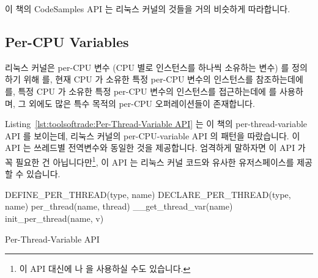 {{{{이 책의 CodeSamples API 는 리눅스 커널의 것들을 거의 비슷하게 따라합니다.

\subsection{Per-CPU Variables}
\label{sec:toolsoftrade:Per-CPU Variables}

리눅스 커널은 per-CPU 변수 (CPU 별로 인스턴스를 하나씩 소유하는 변수) 를
정의하기 위해  를, 현재 CPU 가 소유한 특정 per-CPU 변수의
인스턴스를 참조하는데에  를, 특정 CPU 가 소유한 특정 per-CPU
변수의 인스턴스를 접근하는데에  를 사용하며, 그 외에도 많은 특수
목적의 per-CPU 오퍼레이션들이 존재합니다.

Listing~\ref{lst:toolsoftrade:Per-Thread-Variable API}
는 이 책의 per-thread-variable API 를 보이는데, 리눅스 커널의 per-CPU-variable
API 의 패턴을 따랐습니다.
이 API 는 쓰레드별 전역변수와 동일한 것을 제공합니다.
엄격하게 말하자면 이 API 가 꼭 필요한 건 아닙니다만\footnote{
	이 API 대신에  나  을 사용하실 수도
	있습니다.},
이 API 는 리눅스 커널 코드와 유사한 유저스페이스를 제공할 수 있습니다.

\begin{listing}[tbp]
\begin{VerbatimL}[numbers=none]
DEFINE_PER_THREAD(type, name)
DECLARE_PER_THREAD(type, name)
per_thread(name, thread)
__get_thread_var(name)
init_per_thread(name, v)
\end{VerbatimL}
\caption{Per-Thread-Variable API}
\label{lst:toolsoftrade:Per-Thread-Variable API}
\end{listing}

}}}}
